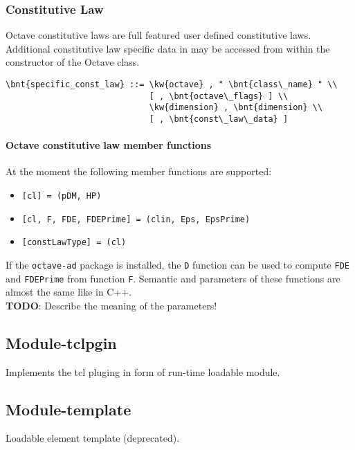 \subsubsection{Constitutive Law}
Octave constitutive laws are full featured user defined constitutive laws.
Additional constitutive law specific data in  may be accessed from within the constructor of the Octave class.
\begin{Verbatim}[commandchars=\\\{\}]
    \bnt{specific_const_law} ::= \kw{octave} , " \bnt{class\_name} " \\
                             [ , \bnt{octave\_flags} ] \\
                             \kw{dimension} , \bnt{dimension} \\
                             [ , \bnt{const\_law\_data} ]
\end{Verbatim}

\paragraph{Octave constitutive law member functions}
At the moment the following member functions are supported:
\begin{itemize}
\item \verb![cl] = !\verb!(pDM, HP) !
\item \verb![cl, F, FDE, FDEPrime] = !\verb!(clin, Eps, EpsPrime) !
\item \verb![constLawType] = !\verb!(cl) !
\end{itemize}
If the \texttt{octave-ad} package is installed, the \texttt{D} function
can be used to compute \texttt{FDE} and \texttt{FDEPrime}
from function \texttt{F}.
Semantic and parameters of these functions are almost the same like in C++. \\
\textbf{TODO}: Describe the meaning of the parameters!

\subsection{Module-tclpgin}
Implements the tcl pluging in form of run-time loadable module.
 
\subsection{Module-template}
Loadable element template (deprecated).

